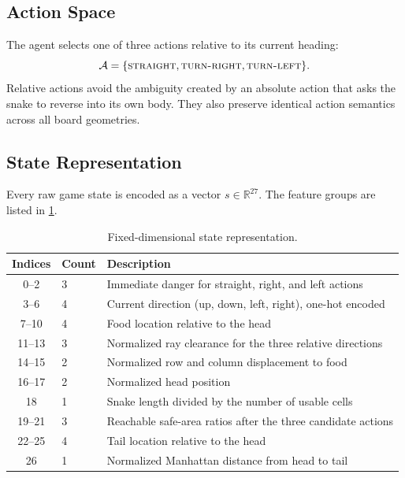 \documentclass[journal]{IEEEtran}
\begin{document}
\subsection{Action Space}

The agent selects one of three actions relative to its current heading:
\begin{equation}
  \mathcal{A}=\{\textsc{straight},\textsc{turn-right},\textsc{turn-left}\}.
\end{equation}
Relative actions avoid the ambiguity created by an absolute action that asks the
snake to reverse into its own body. They also preserve identical action
semantics across all board geometries.

\subsection{State Representation}

Every raw game state is encoded as a vector $s\in\mathbb{R}^{27}$. The feature
groups are listed in \cref{tab:state-features}.

\begin{table}[t]
  \centering
  \caption{Fixed-dimensional state representation.}
  \label{tab:state-features}
  \begin{tabular}{clp{8.2cm}}
    \toprule
    Indices & Count & Description \\
    \midrule
    0--2   & 3 & Immediate danger for straight, right, and left actions \\
    3--6   & 4 & Current direction (up, down, left, right), one-hot encoded \\
    7--10  & 4 & Food location relative to the head \\
    11--13 & 3 & Normalized ray clearance for the three relative directions \\
    14--15 & 2 & Normalized row and column displacement to food \\
    16--17 & 2 & Normalized head position \\
    18     & 1 & Snake length divided by the number of usable cells \\
    19--21 & 3 & Reachable safe-area ratios after the three candidate actions \\
    22--25 & 4 & Tail location relative to the head \\
    26     & 1 & Normalized Manhattan distance from head to tail \\
    \bottomrule
  \end{tabular}
\end{table}
\end{document}
